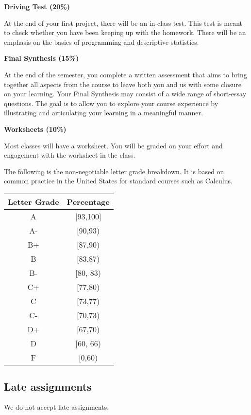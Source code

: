 \documentclass[
]{article}
\begin{document}
\textbf{Driving Test (20\%)}

At the end of your first project, there will be an in-class test. This test is meant to check whether you have been keeping up with the homework. There will be an emphasis on the basics of programming and descriptive statistics.

\textbf{Final Synthesis (15\%)}

At the end of the semester, you complete a written assessment that aims to bring together all aspects from the course to leave both you and us with some closure on your learning. Your Final Synthesis may consist of a wide range of short-essay questions. The goal is to allow you to explore your course experience by illustrating and articulating your learning in a meaningful manner.

\textbf{Worksheets (10\%)}

Most classes will have a worksheet. You will be graded on your effort and engagement with the worksheet in the class.

The following is the non-negotiable letter grade breakdown. It is based on
common practice in the United States for standard courses such as Calculus.

\begin{longtable}[]{@{}cc@{}}
\toprule\noalign{}
\textbf{Letter Grade} & \textbf{Percentage} \\
\midrule\noalign{}
\endhead
\bottomrule\noalign{}
\endlastfoot
A & {[}93,100{]} \\
A- & {[}90,93) \\
B+ & {[}87,90) \\
B & {[}83,87) \\
B- & {[}80, 83) \\
C+ & {[}77,80) \\
C & {[}73,77) \\
C- & {[}70,73) \\
D+ & {[}67,70) \\
D & {[}60, 66) \\
F & {[}0,60) \\
\end{longtable}

\hypertarget{late-assignments}{%
\subsection*{Late assignments}\label{late-assignments}}

We do not accept late assignments.
\end{document}

